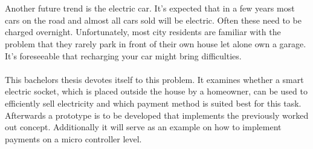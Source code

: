 \\\\
Another future trend is the electric car. It’s expected that in a few years most cars on the road and almost all cars sold will be electric. Often these need to be charged overnight. Unfortunately, most city residents are familiar with the problem that they rarely park in front of their own house let alone own a garage. It’s foreseeable that recharging your car might bring difficulties.
\\\\ 
This bachelors thesis devotes itself to this problem. It examines whether a smart electric socket, which is placed outside the house by a homeowner, can be used to efficiently sell electricity and which payment method is suited best for this task. Afterwards a prototype is to be developed that implements the previously worked out concept. Additionally it will serve as an example on how to implement  payments on a micro controller level.